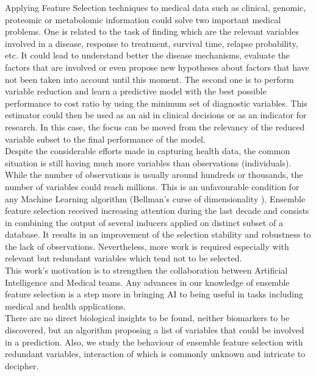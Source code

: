 Applying Feature Selection techniques to medical data such as clinical, genomic, proteomic or metabolomic information could solve two important medical problems. One is related to the task of finding which are the relevant variables involved in a disease, response to treatment, survival time, relapse probability, etc. It could lead to understand better the disease mechanisms, evaluate the factors that are involved or even propose new hypotheses about factors that have not been taken into account until this moment. The second one is to perform variable reduction and learn a predictive model with the best possible performance to cost ratio by using the minimum set of diagnostic variables. This estimator could then be used as an aid in clinical decisions or as an indicator for research. In this case, the focus can be moved from the relevancy of the reduced variable subset to the final performance of the model. 
\\

Despite the considerable efforts made in capturing health data, the common situation is still having much more variables than observations (individuals). While the number of observations is usually around hundreds or thousands, the number of variables could reach millions. This is an unfavourable condition for any Machine Learning algorithm (Bellman's curse of dimensionality \cite{Bellman2015AdaptiveTour}). Ensemble feature selection received increasing attention during the last decade \cite{Bolon-Canedo2019EnsemblesTrends} \cite{Pes2020EnsembleDomains} and consists in combining the output of several inducers applied on distinct subset of a database. It results in an improvement of the selection stability and robustness to the lack of observations. Nevertheless, more work is required especially with relevant but redundant variables which tend not to be selected. 
\\

This work's motivation is to strengthen the collaboration between Artificial Intelligence and Medical teams. Any advances in our knowledge of ensemble feature selection is a step more in bringing AI to being useful in tasks including medical and health applications. 
\\

There are no direct biological insights to be found, neither biomarkers to be discovered, but an algorithm proposing a list of variables that could be involved in a prediction. Also, we study the behaviour of ensemble feature selection with redundant variables, interaction of which is commonly unknown and intricate to decipher.
\\

